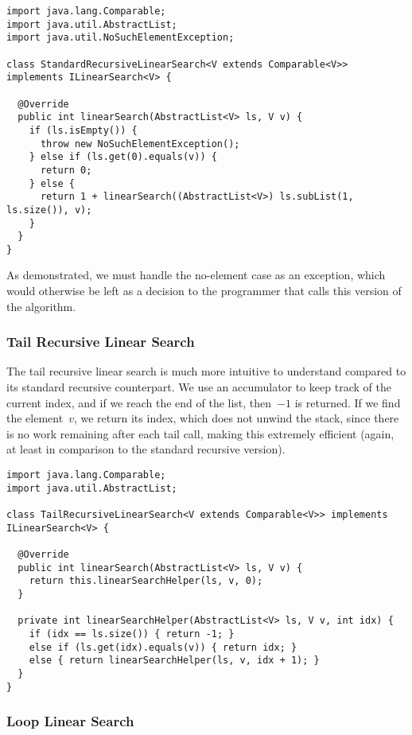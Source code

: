\begin{lstlisting}[language=MyJava]
import java.lang.Comparable;
import java.util.AbstractList;
import java.util.NoSuchElementException;
  
class StandardRecursiveLinearSearch<V extends Comparable<V>> implements ILinearSearch<V> {
  
  @Override
  public int linearSearch(AbstractList<V> ls, V v) {
    if (ls.isEmpty()) { 
      throw new NoSuchElementException(); 
    } else if (ls.get(0).equals(v)) { 
      return 0;
    } else { 
      return 1 + linearSearch((AbstractList<V>) ls.subList(1, ls.size()), v); 
    }
  }
}
\end{lstlisting}

As demonstrated, we must handle the no-element case as an exception, which would otherwise be left as a decision to the programmer that calls this version of the  algorithm.

\subsubsection*{Tail Recursive Linear Search}

The tail recursive linear search is much more intuitive to understand compared to its standard recursive counterpart. 
We use an accumulator to keep track of the current index, and if we reach the end of the list, then~$-1$ is returned. 
If we find the element~$v$, we return its index, which does not unwind the stack, since there is no work remaining after each tail call, making this extremely efficient (again, at least in comparison to the standard recursive version).

\begin{lstlisting}[language=MyJava]
import java.lang.Comparable;
import java.util.AbstractList;

class TailRecursiveLinearSearch<V extends Comparable<V>> implements ILinearSearch<V> {

  @Override
  public int linearSearch(AbstractList<V> ls, V v) {
    return this.linearSearchHelper(ls, v, 0);
  }

  private int linearSearchHelper(AbstractList<V> ls, V v, int idx) {
    if (idx == ls.size()) { return -1; }
    else if (ls.get(idx).equals(v)) { return idx; }
    else { return linearSearchHelper(ls, v, idx + 1); }
  }
}
\end{lstlisting}

\subsubsection*{Loop Linear Search}

